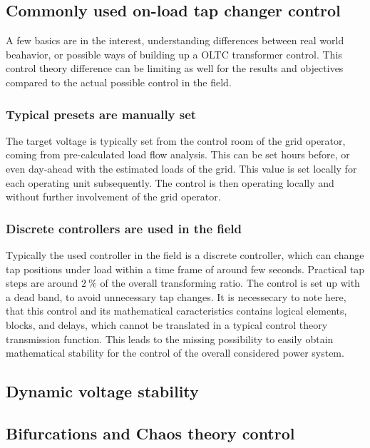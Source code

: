 \subsection{Commonly used on-load tap changer control}

A few basics are in the interest, understanding differences between real world beahavior, or possible ways of building up a \acs{OLTC} transformer control. This control theory difference can be limiting as well for the results and objectives compared to the actual possible control in the field.

\subsubsection{Typical presets are manually set}

The target voltage is typically set from the control room of the grid operator, coming from pre-calculated load flow analysis. This can be set hours before, or even day-ahead with the estimated loads of the grid. This value is set locally for each operating unit subsequently. The control is then operating locally and without further involvement of the grid operator. \quelle

\subsubsection{Discrete controllers are used in the field}

Typically the used controller in the field is a discrete controller, which can change tap positions under load within a time frame of around few seconds. Practical tap steps are around $2~\mathrm{\%}$ of the overall transforming ratio. The control is set up with a dead band, to avoid unnecessary tap changes. It is necessecary to note here, that this control and its mathematical caracteristics contains logical elements, blocks, and delays, which cannot be translated in a typical control theory transmission function. This leads to the missing possibility to easily obtain mathematical stability for the control of the overall considered power system. \quelle

\subsection{Dynamic voltage stability}


\subsection{Bifurcations and Chaos theory control}

